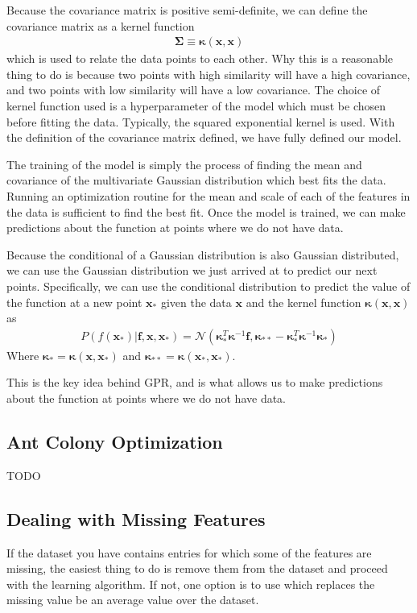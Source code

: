 Because the covariance matrix is positive semi-definite, we can define the covariance matrix as a kernel function 
\begin{align}
    \boldsymbol{\Sigma} \equiv \boldsymbol{\kappa}(\textbf{x},\textbf{x})
\end{align}
which is used to relate the data points to each other. Why this is a reasonable thing
to do is because two points with high similarity will have a high covariance, and two points with low similarity will have a low covariance. The choice of kernel function used is
a hyperparameter of the model which must be chosen before fitting the data. Typically, the squared exponential kernel is used. With the definition of the covariance matrix defined, 
we have fully defined our model.

The training of the model is simply the process of finding the mean and covariance of the multivariate Gaussian distribution which best fits the data. Running an optimization routine for 
the mean and scale of each of the features in the data is sufficient to find the best fit. Once the model is trained, we can make predictions about the function at points where we do not have data.

Because the conditional of a Gaussian distribution is also Gaussian distributed, we can use the Gaussian distribution we just arrived at to predict our next points. Specifically, we can use the conditional distribution to predict the value of the function at a new point $\textbf{x}_*$ given the data $\textbf{x}$ and the kernel function $\boldsymbol{\kappa}(\textbf{x},\textbf{x})$ as
\begin{align}
    P(f(\textbf{x}_*)|\textbf{f}, \textbf{x}, \textbf{x}_*) = \mathcal{N}(\boldsymbol{\kappa}_*^T\boldsymbol{\kappa}^{-1}\textbf{f}, \boldsymbol{\kappa}_{**} - \boldsymbol{\kappa}_*^T\boldsymbol{\kappa}^{-1}\boldsymbol{\kappa}_*)
\end{align}
Where $\boldsymbol{\kappa}_* = \boldsymbol{\kappa}(\textbf{x},\textbf{x}_*)$ and $\boldsymbol{\kappa}_{**} = \boldsymbol{\kappa}(\textbf{x}_*,\textbf{x}_*)$.


This is the key idea behind GPR, and is what allows us to make predictions about the function at points where we do not have data.


\subsection{Ant Colony Optimization}
TODO

\subsection{Dealing with Missing Features}
If the dataset you have contains entries for which some of the features are missing, the easiest thing to do is remove them from the dataset and proceed with the learning algorithm. If not, one option is to use  which replaces the missing value be an average value over the dataset.

